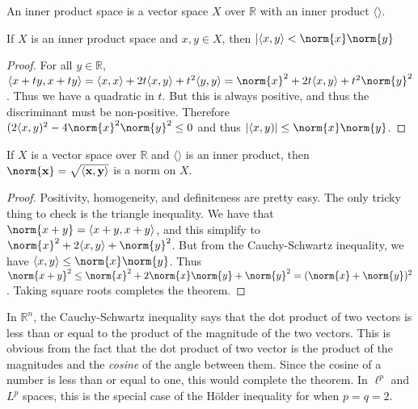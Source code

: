        \begin{definition}
            An inner product space is a vector space
            $X$ over $\mathbb{R}$ with an inner product
            $\langle\rangle$.
        \end{definition}
        \begin{theorem}
            If $X$ is an inner product space
            and $x,y\in{X}$, then
            $|\langle{x,y}\rangle<\norm{x}\norm{y}$
        \end{theorem}
        \begin{proof}
            For all $y\in\mathbb{R}$,
            $\langle{x+ty,x+ty}\rangle%
             =\langle{x,x}\rangle%
             +2t\langle{x,y}\rangle%
             +t^{2}\langle{y,y}\rangle%
             =\norm{x}^{2}+2t\langle{x,y}\rangle%
             +t^{2}\norm{y}^{2}$. Thus we have a
            quadratic in $t$. But this is always positive,
            and thus the discriminant must be non-positive. Therefore
            $(2\langle{x,y})^{2}-4\norm{x}^{2}\norm{y}^{2}%
             \leq{0}$
            and thus
            $|\langle{x,y})|\leq\norm{x}\norm{y}$.
        \end{proof}
        \begin{theorem}
            If $X$ is a vector space over $\mathbb{R}$
            and $\langle\rangle$ is an inner product,
            then
            $\norm{\mathbf{x}}%
             =\sqrt{\langle\mathbf{x},\mathbf{y}\rangle}$
            is a norm on $X$.
        \end{theorem}
        \begin{proof}
            Positivity, homogeneity, and definiteness are
            pretty easy. The only tricky thing to check is
            the triangle inequality. We have that
            $\norm{x+y}=\langle{x+y,x+y}\rangle$,
            and this simplify to
            $\norm{x}^{2}+2\langle{x,y}\rangle+\norm{y}^{2}$.
            But from the Cauchy-Schwartz inequality, we
            have $\langle{x,y}\rangle\leq\norm{x}\norm{y}$.
            Thus
            $\norm{x+y}^{2}\leq\norm{x}^{2}%
             +2\norm{x}\norm{y}+\norm{y}^{2}%
             =(\norm{x}+\norm{y})^{2}$. Taking square roots
             completes the theorem.
        \end{proof}
        In $\mathbb{R}^{n}$, the Cauchy-Schwartz inequality
        says that the dot product of two vectors is less
        than or equal to the product of the magnitude
        of the two vectors.
        This is obvious from the fact that the dot product
        of two vector is the product of the magnitudes and
        the \textit{cosine} of the angle between them.
        Since the cosine of a number is less than or equal
        to one, this would complete the theorem.
        In $\ell^{p}$ and $L^{p}$ spaces, this is the
        special case of the H\"{o}lder inequality for
        when $p=q=2$.
